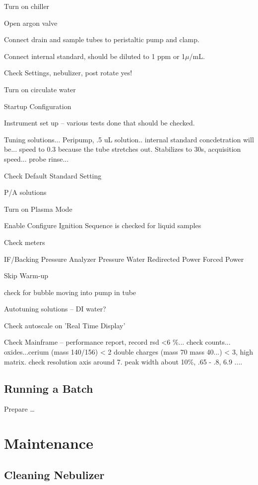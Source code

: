 \documentclass[12pt]{../SOP4_alpha}\usepackage[]{graphicx}\usepackage[]{color}
\begin{document}
\NP Turn on chiller

\NP Open argon valve

\NP Connect drain and sample tubes to peristaltic pump and clamp.

\NP Connect internal standard, should be diluted to 1 ppm or 1$\mu$/mL. 

\NP Check Settings, nebulizer, post rotate yes!

\NP Turn on circulate water

\NP Startup Configuration

\NP Instrument set up -- various tests done that should be checked.

\NP Tuning solutions... Peripump, .5 uL solution.. internal standard concdetration will be...  speed to 0.3 because the tube stretches out. Stabilizes to 30s, acquisition speed... probe rinse... 

\NP Check Default Standard Setting

\NP P/A solutions

\NP Turn on Plasma Mode 

\NP Enable Configure Ignition Sequence is checked for liquid samples

\NP Check meters 

IF/Backing Pressure
Analyzer Pressure
Water
Redirected Power
Forced Power


\NP Skip Warm-up

\NP check for bubble moving into pump in tube

\NP Autotuning solutions -- DI water?

\NP Check autoscale on 'Real Time Display'

\NP Check Mainframe -- performance report, record rsd <6 \%... check counts... oxides...cerium (mass 140/156) < 2 double charges (mass 70 mass 40...) < 3, high matrix.  check resolution axis around 7. peak width about 10\%, .65 - .8, 6.9 ....


\subsection{Running a Batch}

\NP Prepare \dots

\NP

\section{Maintenance}

\subsection{Cleaning Nebulizer}
\end{document}
